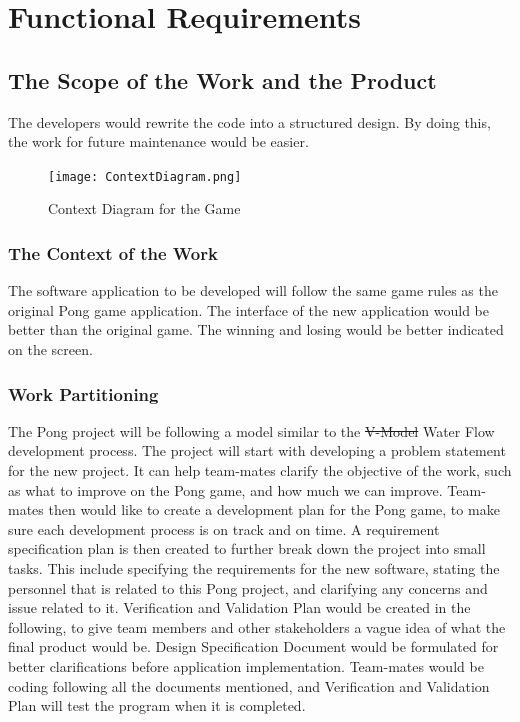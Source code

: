 \documentclass[12pt,letterpaper]{article}
\begin{document}
	
	\section{Functional Requirements}

	\subsection{The Scope of the Work and the Product}
The developers would rewrite the code into a structured design. By doing this, the work for future maintenance would be easier.

\begin{figure}[h]
  \texttt{[image: ContextDiagram.png]}
  \caption{Context Diagram for the Game}
\end{figure}

	\subsubsection{The Context of the Work}
The software application to be developed will follow the same game rules as the original Pong game application. The interface of the new application would be better than the original game. The winning and losing would be better indicated on the screen.
	\subsubsection{Work Partitioning}
	The Pong project will be following a model similar to the \st{V-Model} Water Flow development process. The project will start with developing a problem statement for the new project. It can help team-mates clarify the objective of the work, such as what to improve on the Pong game, and how much we can improve. Team-mates then would like to create a development plan for the Pong game, to make sure each development process is on track and on time. A requirement specification plan is then created to further break down the project into small tasks. This include specifying the requirements for the new software, stating the personnel that is related to this Pong project, and clarifying any concerns and issue related to it. Verification and Validation Plan would be created in the following, to give team members and other stakeholders a vague idea of what the final product would be. Design Specification Document would be formulated for better clarifications before application implementation. Team-mates would be coding following all the documents mentioned, and Verification and Validation Plan will test the program when it is completed.\\
\end{document}
